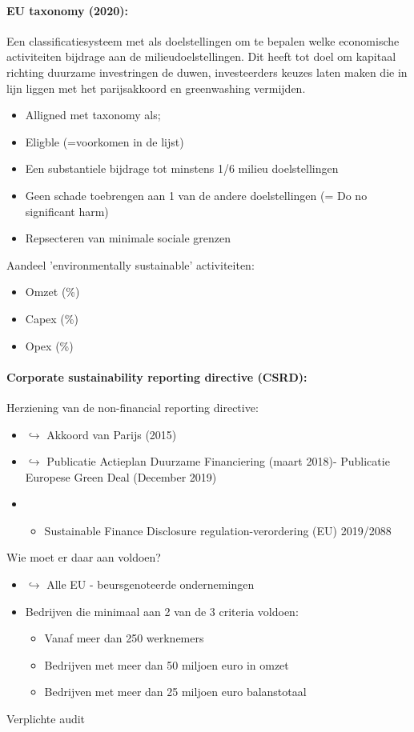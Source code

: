 \documentclass[12pt]{article}
\begin{document}
\paragraph{EU taxonomy (2020):}
Een classificatiesysteem met als doelstellingen om te bepalen welke economische activiteiten bijdrage aan de milieudoelstellingen. Dit heeft tot doel om kapitaal richting duurzame investringen de duwen, investeerders keuzes laten maken die in lijn liggen met het parijsakkoord en greenwashing vermijden.
\begin{itemize}
    \item[] Alligned met taxonomy als;
    \item Eligble (=voorkomen in de lijst)
    \item Een substantiele bijdrage tot minstens 1/6 milieu doelstellingen 
    \item Geen schade toebrengen aan 1 van de andere doelstellingen (= Do no significant harm)
    \item Repsecteren van minimale sociale grenzen
\end{itemize}
Aandeel 'environmentally sustainable' activiteiten:\begin{itemize}
    \item Omzet (\%)
    \item Capex (\%)
    \item Opex (\%)
\end{itemize}
\paragraph{Corporate sustainability reporting directive (CSRD):}
Herziening van de non-financial reporting directive:
\begin{itemize}
    \item $\hookrightarrow$ Akkoord van Parijs (2015)
    \item $\hookrightarrow$ Publicatie Actieplan Duurzame Financiering (maart 2018)- Publicatie Europese Green Deal (December 2019)
    \item[]\begin{itemize}
        \item Sustainable Finance Disclosure regulation-verordering (EU) 2019/2088
    \end{itemize}
\end{itemize}
Wie moet er daar aan voldoen?
\begin{itemize}
    \item $\hookrightarrow$ Alle EU - beursgenoteerde ondernemingen
    \item Bedrijven die minimaal aan 2 van de 3 criteria voldoen:\begin{itemize}
        \item Vanaf meer dan 250 werknemers 
        \item Bedrijven met meer dan 50 miljoen euro in omzet 
        \item Bedrijven met meer dan 25 miljoen euro balanstotaal
    \end{itemize}
\end{itemize}
Verplichte audit
\end{document}
